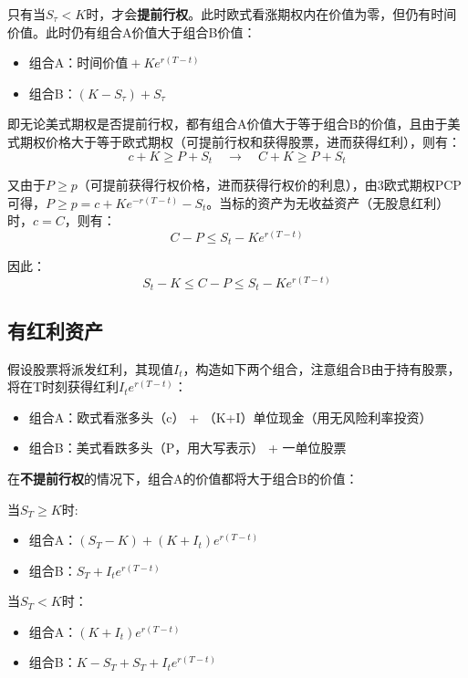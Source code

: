 \documentclass[11pt]{article}
\begin{document}
只有当$S_\tau<K$时，才会\textbf{提前行权}。此时欧式看涨期权内在价值为零，但仍有时间价值。此时仍有组合A价值大于组合B价值：
\begin{itemize}
\setlength{\itemindent}{2em}
    \item 组合A：$ \text{时间价值} + Ke^{r(T-t)}$
    \item 组合B：$(K-S_\tau) + S_\tau$
\end{itemize}

即无论美式期权是否提前行权，都有组合A价值大于等于组合B的价值，且由于美式期权价格大于等于欧式期权（可提前行权和获得股票，进而获得红利），则有：
\begin{equation*}
    c + K \geq P + S_t \quad \rightarrow \quad C + K \geq P + S_t
\end{equation*}

又由于$P \geq p$（可提前获得行权价格，进而获得行权价的利息），由3欧式期权PCP可得，$P\geq p = c + Ke^{-r(T-t)} - S_t$。当标的资产为无收益资产（无股息红利）时，$c=C$，则有：
\begin{equation*}
    C-P \leq S_t - Ke^{r(T-t)}
\end{equation*}

因此：
\begin{equation*}
   S_t - K \leq C-P \leq S_t - Ke^{r(T-t)}
\end{equation*}

\subsection{有红利资产}
假设股票将派发红利，其现值$I_t$，构造如下两个组合，注意组合B由于持有股票，将在T时刻获得红利$I_t e^{r(T-t)}$：
\begin{itemize}
\setlength{\itemindent}{2em}
    \item 组合A：欧式看涨多头（c） + （K+I）单位现金（用无风险利率投资）
    \item 组合B：美式看跌多头（P，用大写表示） + 一单位股票
\end{itemize}

在\textbf{不提前行权}的情况下，组合A的价值都将大于组合B的价值：
\begin{multicols}{2}
当$S_T \geq K$时:
\begin{itemize}
\setlength{\itemindent}{2em}
    \item 组合A：$(S_T-K) + (K+I_t)e^{r(T-t)}$
    \item 组合B：$S_T + I_t e^{r(T-t)}$
\end{itemize}
\vfill\columnbreak
当$S_T < K$时：
\begin{itemize}
    \item 组合A：$(K+I_t)e^{r(T-t)}$
    \item 组合B：$K- S_T + S_T + I_t e^{r(T-t)}$
\end{itemize}
\end{multicols}
\end{document}
